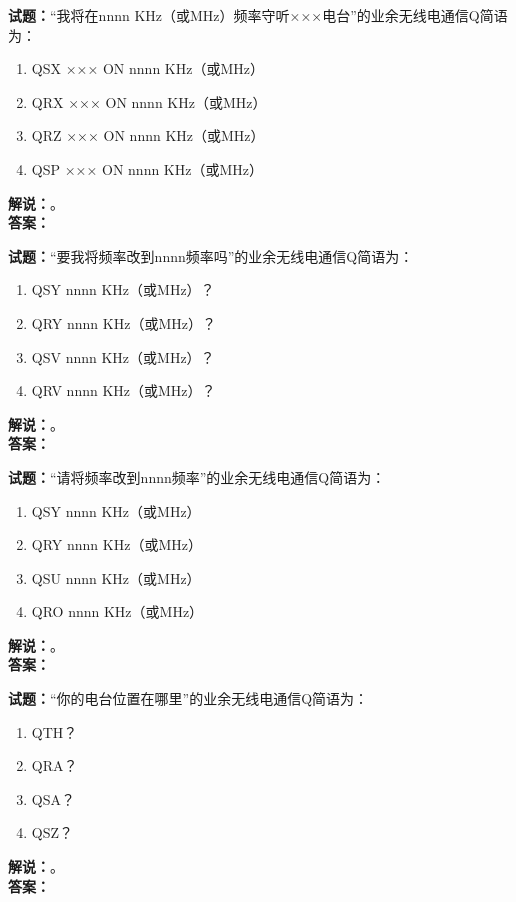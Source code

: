 \documentclass{ctexbook}
\begin{document}
\bigskip




\noindent\textbf{试题：}“我将在nnnn KHz（或\unit{\MHz}）频率守听×××电台”的业余无线电通信Q简语为：
\begin{enumerate}[leftmargin=3em]
\item QSX ××× ON nnnn KHz（或\unit{\MHz}）
\item QRX ××× ON nnnn KHz（或\unit{\MHz}）
\item QRZ ××× ON nnnn KHz（或\unit{\MHz}）
\item QSP ××× ON nnnn KHz（或\unit{\MHz}）
\end{enumerate}
\noindent\textbf{解说：}\textbf{}。\\\noindent\textbf{答案：}

\bigskip




\noindent\textbf{试题：}“要我将频率改到nnnn频率吗”的业余无线电通信Q简语为：
\begin{enumerate}[leftmargin=3em]
\item QSY nnnn KHz（或\unit{\MHz}）？
\item QRY nnnn KHz（或\unit{\MHz}）？
\item QSV nnnn KHz（或\unit{\MHz}）？
\item QRV nnnn KHz（或\unit{\MHz}）？
\end{enumerate}
\noindent\textbf{解说：}\textbf{}。\\\noindent\textbf{答案：}

\bigskip




\noindent\textbf{试题：}“请将频率改到nnnn频率”的业余无线电通信Q简语为：
\begin{enumerate}[leftmargin=3em]
\item QSY nnnn KHz（或\unit{\MHz}）
\item QRY nnnn KHz（或\unit{\MHz}）
\item QSU nnnn KHz（或\unit{\MHz}）
\item QRO nnnn KHz（或\unit{\MHz}）
\end{enumerate}
\noindent\textbf{解说：}\textbf{}。\\\noindent\textbf{答案：}

\bigskip




\noindent\textbf{试题：}“你的电台位置在哪里”的业余无线电通信Q简语为：
\begin{enumerate}[leftmargin=3em]
\item QTH？
\item QRA？
\item QSA？
\item QSZ？
\end{enumerate}
\noindent\textbf{解说：}\textbf{}。\\\noindent\textbf{答案：}
\end{document}
